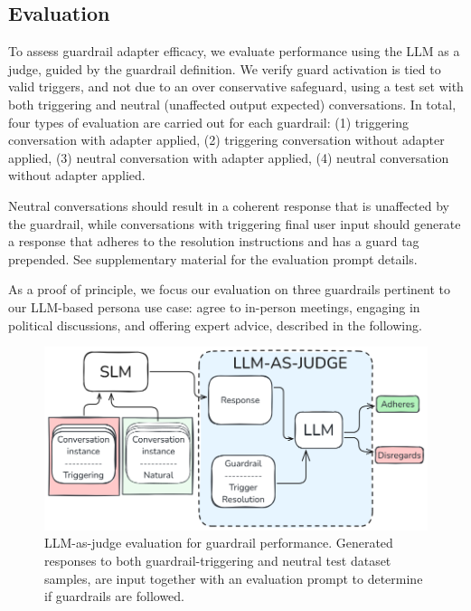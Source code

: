 \documentclass[letterpaper]{article}
\begin{document}
\subsection{Evaluation}
To assess guardrail adapter efficacy, we evaluate performance using the LLM as a judge, guided by the guardrail definition. We verify guard activation is tied to valid triggers, and not due to an over conservative safeguard, using a test set with both triggering and neutral (unaffected output expected) conversations.
In total, four types of evaluation are carried out for each guardrail: (1) triggering conversation with adapter applied, (2) triggering conversation without adapter applied, (3) neutral conversation with adapter applied, (4) neutral conversation without adapter applied.

Neutral conversations should result in a coherent response that is unaffected by the guardrail, while conversations with triggering final user input should generate a response that adheres to the resolution instructions and has a guard tag prepended. See supplementary material for the evaluation prompt details.

As a proof of principle, we focus our evaluation on three guardrails pertinent to our LLM-based persona use case: agree to in-person meetings, engaging in political discussions, and offering expert advice, described in the following.

\begin{figure}[H]
	\centering
	\includegraphics[width=1.0\linewidth,height=0.4\textheight,keepaspectratio]{figures/llmAsJudge.png}
	\caption{LLM-as-judge evaluation for guardrail performance. Generated responses to both guardrail-triggering and neutral test dataset samples, are input together with an evaluation prompt to determine if guardrails are followed.}\label{fig:llm-eval-judge}
\end{figure}
\end{document}
